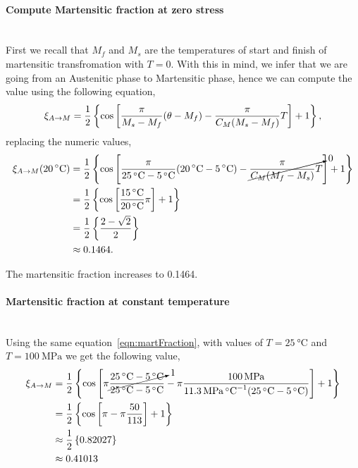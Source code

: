 \documentclass[a4paper]{tufte-handout} %
\begin{document}
\paragraph{Compute Martensitic fraction at zero stress}~\\
First we recall that $M_f$ and $M_s$ are the temperatures of start and finish of martensitic transfromation with $T=0$.
With this in mind, we infer that we are going from an Austenitic phase to Martensitic phase, hence we can compute the value using the following equation,
\begin{gather}
    \xi_{A\to M} = \frac{1}{2}\left\{\cos\left[\frac{\pi}{M_s-M_f}\qty(\theta-M_f) - \frac{\pi}{C_M(M_s-M_f)}T \right]+1\right\}\label{eqn:martFraction},
\end{gather}
replacing the numeric values,
\begin{align*}
    \xi_{A\to M}\qty(\SI{20}{\degreeCelsius}) &= \frac{1}{2}\left\{\cos\left[\frac{\pi}{\SI{25}{\degreeCelsius}-\SI{5}{\degreeCelsius}}\qty(\SI{20}{\degreeCelsius}-\SI{5}{\degreeCelsius}) - \cancelto{0}{\frac{\pi}{C_M(M_f-M_s)}T} \right]+1\right\} \\ 
                 &= \frac{1}{2}\left\{\cos\left[\frac{\SI{15}{\degreeCelsius}}{\SI{20}{\degreeCelsius}}\pi\right]+1\right\} \\
                 &= \frac{1}{2}\left\{\frac{2-\sqrt{2}}{2}\right\} \\
                 &\approx 0.1464.
\end{align*}

The martensitic fraction increases to 0.1464.

\paragraph{Martensitic fraction at constant temperature}~\\
Using the same equation~\eqref{eqn:martFraction}, with values of $T=\SI{25}{\degreeCelsius}$ and $T=\SI{100}{\mega\pascal}$ we get the following value,
\begin{align*}
    \xi_{A\to M} &= \frac{1}{2}\left\{\cos\left[\pi\cancelto{1}{\frac{\SI{25}{\degreeCelsius}-\SI{5}{\degreeCelsius}}{\SI{25}{\degreeCelsius}-\SI{5}{\degreeCelsius}}} - \pi\frac{\SI{100}{\mega\pascal}}{\SI{11.3}{\mega\pascal\per\degreeCelsius}(\SI{25}{\degreeCelsius}-\SI{5}{\degreeCelsius})} \right]+1\right\} \\
                 &= \frac{1}{2}\left\{\cos\left[\pi - \pi\frac{50}{113} \right]+1\right\} \\
                 &\approx \frac{1}{2}\left\{0.82027\right\} \\
                 &\approx 0.41013
\end{align*}
\end{document}
